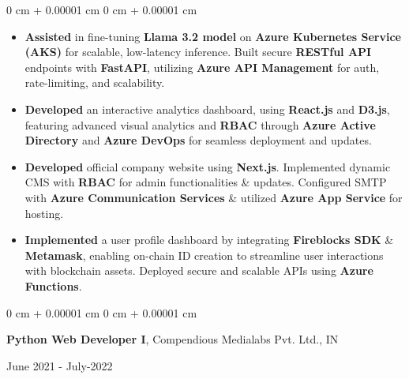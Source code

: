 \documentclass[10pt, letterpaper]{article}
\newenvironment{highlights}{
    \begin{itemize}[
        topsep=0.10 cm,
        parsep=0.10 cm,
        partopsep=0pt,
        itemsep=0pt,
        leftmargin=0 cm + 10pt
    ]
}{
    \end{itemize}
} %
\newenvironment{onecolentry}{
    \begin{adjustwidth}{
        0 cm + 0.00001 cm
    }{
        0 cm + 0.00001 cm
    }
}{
    \end{adjustwidth}
} %
\newenvironment{twocolentry}[2][]{
    \onecolentry
    \def\secondColumn{#2}
    \setcolumnwidth{\fill, 4.5 cm}
    \begin{paracol}{2}
}{
    \switchcolumn \raggedleft \secondColumn
    \end{paracol}
    \endonecolentry
} %
\begin{document}
    \begin{onecolentry}
        \begin{highlights}
            \item \textbf{Assisted} in fine-tuning \textbf{Llama 3.2 model} on \textbf{Azure Kubernetes Service (AKS)} for scalable, low-latency inference. Built secure \textbf{RESTful API} endpoints with \textbf{FastAPI}, utilizing \textbf{Azure API Management} for auth, rate-limiting, and scalability. 
            \item \textbf{Developed} an interactive analytics dashboard, using \textbf{React.js} and \textbf{D3.js}, featuring advanced visual analytics and \textbf{RBAC} through \textbf{Azure Active Directory} and \textbf{Azure DevOps} for seamless deployment and updates.
            \item \textbf{Developed} official company website using \textbf{Next.js}. Implemented dynamic CMS with \textbf{RBAC} for admin functionalities \& updates. Configured SMTP with \textbf{Azure Communication Services} \& utilized \textbf{Azure App Service} for hosting.
            \item \textbf{Implemented} a user profile dashboard by integrating \textbf{Fireblocks SDK} \& \textbf{Metamask}, enabling on-chain ID creation to streamline user interactions with blockchain assets. Deployed secure and scalable APIs using \textbf{Azure Functions}.
        \end{highlights}
    \end{onecolentry}
    

    \vspace{0.10 cm}
    \begin{twocolentry}{
        June 2021 - July-2022
    }
        \textbf{Python Web Developer I}, Compendious Medialabs Pvt. Ltd., IN
    \end{twocolentry}
    
\end{document}
